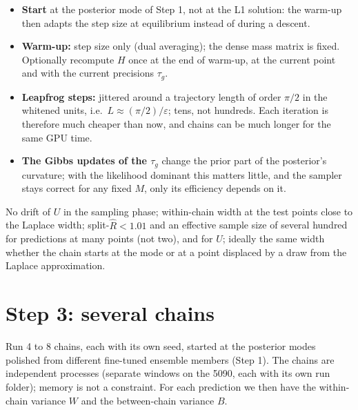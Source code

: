 \begin{itemize}
  \item \textbf{Start} at the posterior mode of Step 1, not at the L1 solution: the warm-up
    then adapts the step size at equilibrium instead of during a descent.
  \item \textbf{Warm-up:} step size only (dual averaging); the dense mass matrix is fixed.
    Optionally recompute $H$ once at the end of warm-up, at the current point and with
    the current precisions $\tau_g$.
  \item \textbf{Leapfrog steps:} jittered around a trajectory length of order
    $\pi/2$ in the whitened units, i.e.\ $L \approx (\pi/2)/\varepsilon$; tens, not
    hundreds. Each iteration is therefore much cheaper than now, and chains can be much
    longer for the same GPU time.
  \item \textbf{The Gibbs updates of the $\tau_g$} change the prior part of the
    posterior's curvature; with the likelihood dominant this matters little, and the
    sampler stays correct for any fixed $M$, only its efficiency depends on it.
\end{itemize}

\begin{keyidea}
No drift of $U$ in the sampling phase; within-chain width at the test points close to the
Laplace width; split-$\hat R < 1.01$ \cite{Vehtari:2021} and an effective sample size of several hundred for
predictions at many points (not two), and for $U$; ideally the same width whether the chain
starts at the mode or at a point displaced by a draw from the Laplace approximation.
\end{keyidea}

\section{Step 3: several chains}
\label{sec:chains}

Run 4 to 8 chains, each with its own seed, started at the posterior modes polished from
different fine-tuned ensemble members (Step 1). The chains are independent processes
(separate  windows on the 5090, each with its own run folder); memory is not a
constraint. For each prediction we then have the within-chain variance $W$ and the
between-chain variance $B$.

